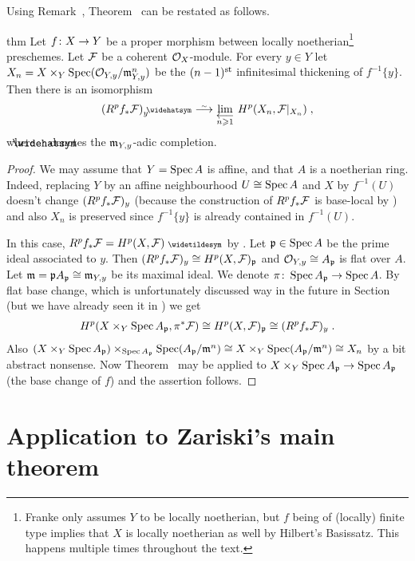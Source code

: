 \documentclass[a4paper,parskip=half,numbers=enddot, DIV=12]{scrreprt}
\renewcommand{\geq}{\geqslant}
\begin{document}
Using Remark~, Theorem~ can be restated as follows.
\begin{varthm}{thm}
	Let $f\colon X\morphism Y$ be a proper morphism between locally noetherian\footnote{Franke only assumes $Y$ to be locally noetherian, but $f$ being of (locally) finite type implies that $X$ is locally noetherian as well by Hilbert's Basissatz. This happens multiple times throughout the text.} preschemes. Let $\mathcal{F}$ be a coherent $\mathcal{O}_X$-module. For every $y\in Y$ let $X_n=X\times_Y\operatorname{Spec} (\mathcal{O}_{Y,y}/\mathfrak{m}_{Y,y}^n)$ be the $(n-1)^{\text{st}}$ infinitesimal thickening of $f^{-1}\{y\}$. Then there is an isomorphism
	\begin{align*}
		(R^pf_*\Ff)_y^\complete\isomorphism\limit[n\geq 1] H^p(X_n,\Ff|_{X_n})\;,
	\end{align*}
	where $\roof{\phantom{x}}$ denotes the $\mathfrak{m}_{Y,y}$-adic completion.
\end{varthm}
\begin{proof}
	We may assume that $Y=\operatorname{Spec} A$ is affine, and that $A$ is a noetherian ring. Indeed, replacing $Y$ by an affine neighbourhood $U\cong \operatorname{Spec} A$ and $X$ by $f^{-1}(U)$ doesn't change $(R^pf_*\mathcal{F})_y$ (because the construction of $R^pf_*\mathcal{F}$ is base-local by \cite[Proposition~1.5.1]{alggeo2}) and also $X_n$ is preserved since $f^{-1}\{y\}$ is already contained in $f^{-1}(U)$.
	
	In this case, $R^pf_*\Ff=H^p(X,\Ff)^\qcmod$ by \cite[Proposition~1.5.1]{alggeo2}. Let $\mathfrak{p}\in\operatorname{Spec} A$ be the prime ideal associated to $y$. Then $(R^pf_*\mathcal{F})_y\cong H^p(X,\mathcal{F})_{\mathfrak{p}}$ and $\mathcal{O}_{Y,y}\cong A_{\mathfrak{p}}$ is flat over $A$. Let $\mathfrak{m}=\mathfrak{p} A_{\mathfrak{p}}\cong \mathfrak{m}_{Y,y}$ be its maximal ideal. We denote $\pi\colon \Spec A_\pp\morphism \Spec A$. By flat base change, which is unfortunately discussed way in the future in Section~ (but we have already seen it in \cite[Fact~4.1.1]{alggeo2}) we get
	\begin{align*}
		H^p(X\times_Y\operatorname{Spec} A_{\mathfrak{p}},\pi^*\mathcal{F})\cong H^p(X,\mathcal{F})_{\mathfrak{p}}\cong (R^pf_*\mathcal{F})_y\;.
	\end{align*}
	Also $(X\times_Y\operatorname{Spec} A_{\mathfrak{p}})\times_{\operatorname{Spec} A_{\mathfrak{p}}}\operatorname{Spec}(A_{\mathfrak{p}}/\mathfrak{m}^n)\cong X\times_Y\operatorname{Spec}(A_{\mathfrak{p}}/\mathfrak{m}^n)\cong X_n$ by a bit abstract nonsense. Now Theorem~ may be applied to $X\times_Y\Spec A_\pp\morphism \Spec A_\pp$ (the base change of $f$) and the assertion follows.
\end{proof}
\section{Application to Zariski's main theorem}
\end{document}
